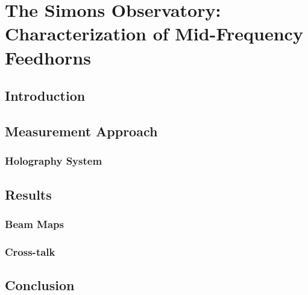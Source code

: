 \chapter{The Simons Observatory: Characterization of Mid-Frequency Feedhorns}
\label{ch:feedhorn}
\section{Introduction}
\section{Measurement Approach}
\subsection{Holography System}
\section{Results}
\subsection{Beam Maps}
\subsection{Cross-talk}
\section{Conclusion}